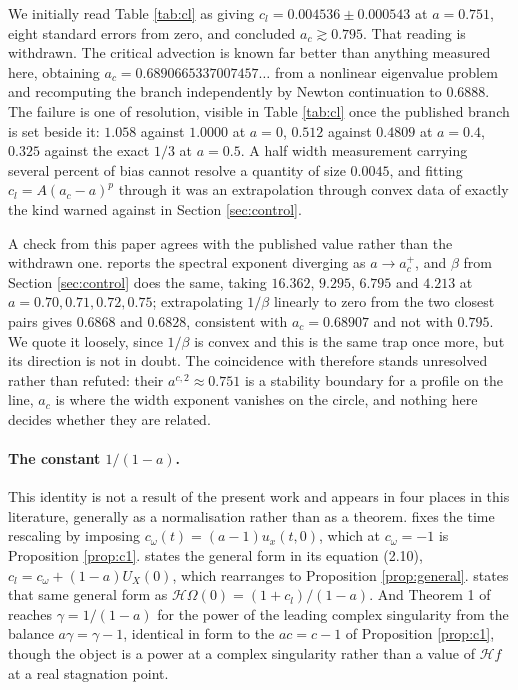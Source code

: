 \documentclass[11pt]{article}
\theoremstyle{definition}
\newcommand{\Hil}{\mathcal{H}}
\begin{document}
We initially read Table \ref{tab:cl} as giving
$c_l = 0.004536\pm0.000543$ at $a=0.751$, eight standard errors from zero, and
concluded $a_c\gtrsim0.795$. That reading is withdrawn. The critical advection
is known
far better than anything measured here, \cite{lss2020} obtaining
$a_c = 0.6890665337007457\ldots$ from a nonlinear eigenvalue problem and
\cite{xu2026} recomputing the branch independently by Newton continuation to
$0.6888$. The failure is one of resolution, visible in Table \ref{tab:cl} once
the published branch is set beside it: $1.058$ against $1.0000$ at $a=0$,
$0.512$ against $0.4809$ at $a=0.4$, $0.325$ against the exact $1/3$ at
$a=0.5$. A half width measurement carrying several percent of bias cannot
resolve a quantity of size $0.0045$, and fitting $c_l = A(a_c-a)^p$ through it
was an extrapolation through convex data of exactly the kind warned against in
Section \ref{sec:control}.

A check from this paper agrees with the published value rather than the
withdrawn one. \cite{lss2020} reports the spectral exponent diverging as
$a\to a_c^+$, and $\beta$ from Section \ref{sec:control} does the same, taking
$16.362$, $9.295$, $6.795$ and $4.213$ at $a=0.70,0.71,0.72,0.75$;
extrapolating $1/\beta$ linearly to zero from the two closest pairs gives
$0.6868$ and $0.6828$, consistent with $a_c=0.68907$ and not with $0.795$. We
quote it loosely, since $1/\beta$ is convex and this is the same trap once
more, but its direction is not in doubt. The coincidence with \cite{htw2026}
therefore stands unresolved rather than refuted: their $a^{c,2}\approx0.751$ is
a stability boundary for a profile on the line, $a_c$ is where the width
exponent vanishes on the circle, and nothing here decides whether they are
related.

\paragraph{The constant $1/(1-a)$.} This identity is not a result of the
present work and appears in four places in this literature, generally as a
normalisation rather than as a theorem. \cite{chenS1} fixes the time rescaling
by imposing $c_\omega(t) = (a-1)u_x(t,0)$, which at $c_\omega=-1$ is
Proposition \ref{prop:c1}. \cite{htw2026} states the general form in its
equation (2.10), $c_l = c_\omega + (1-a)U_X(0)$, which rearranges to
Proposition \ref{prop:general}. \cite{xu2026} states that same general form as
$\Hil\Omega(0) = (1+c_l)/(1-a)$. And Theorem 1 of \cite{lss2020} reaches
$\gamma = 1/(1-a)$ for the power of the leading complex singularity from the
balance $a\gamma = \gamma-1$, identical in form to the $ac = c-1$ of
Proposition \ref{prop:c1}, though the object is a power at a complex
singularity rather than a value of $\Hil f$ at a real stagnation point.
\end{document}
